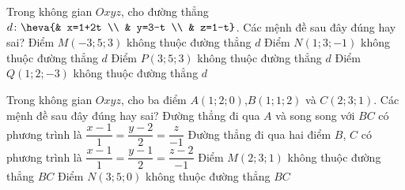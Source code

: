 \begin{ex}%
	Trong không gian $Oxyz$, cho đường thẳng $d\colon \heva{& x=1+2t \\ 
		& y=3-t \\ 
		& z=1-t}$. Các mệnh đề sau đây đúng hay sai?
	\choiceTF
	{ Điểm $M\left( -3;5;3 \right)$ không thuộc đường thẳng $d$}
	{ \True Điểm $N\left( 1;3;-1 \right)$ không thuộc đường thẳng $d$}
	{ \True Điểm $P\left( 3;5;3 \right)$ không thuộc đường thẳng $d$}
	{ \True Điểm $Q\left( 1;2;-3 \right)$ không thuộc đường thẳng $d$}
\end{ex}
\begin{ex}%
	Trong không gian $Oxyz$, cho ba điểm $A(1;2;0)$,$B(1;1;2)$ và $C(2;3;1)$. Các mệnh đề sau đây đúng hay sai?
	\choiceTF
	{ \True Đường thẳng đi qua $A$ và song song với $BC$ có phương trình là $\dfrac{x-1}{1}=\dfrac{y-2}{2}=\dfrac{z}{-1}$}
	{\True Đường thẳng đi qua hai điểm $B$, $C$ có phương trình là $\dfrac{x-1}{1}=\dfrac{y-1}{2}=\dfrac{z-2}{-1}$}
	{ Điểm $M\left( 2;3;1 \right)$ không thuộc đường thẳng $BC$}
	{\True  Điểm $N\left( 3;5;0 \right)$ không thuộc đường thẳng $BC$}
\end{ex}
